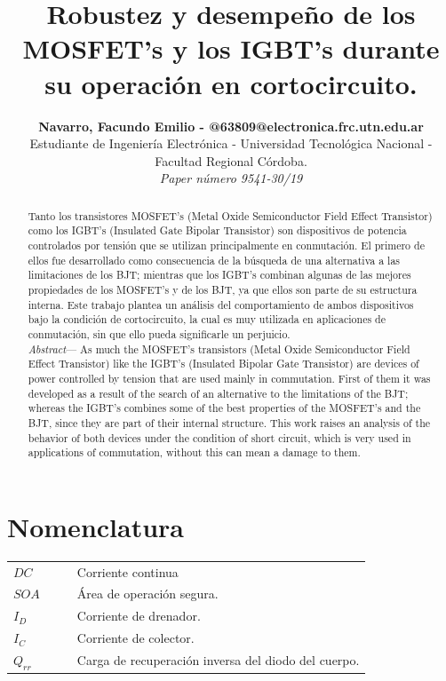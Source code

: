 \documentclass[conference]{IEEEtran}
\begin{document}
\title{Robustez y desempeño de los MOSFET's y los IGBT's durante su operación en cortocircuito.}
\author{
		\begin{tabular}{c}
			\textbf{Navarro, Facundo Emilio - @63809@electronica.frc.utn.edu.ar} \\ 
			Estudiante de Ingeniería Electrónica - Universidad Tecnológica Nacional - Facultad Regional Córdoba.\\
	\textit{Paper número 9541-30/19}
		\end{tabular}
		}
\maketitle

\begin{abstract}
Tanto los transistores MOSFET's (Metal Oxide Semiconductor Field Effect Transistor) como los IGBT's (Insulated Gate Bipolar Transistor) son dispositivos de potencia controlados por tensión que se utilizan principalmente en conmutación. El primero de ellos fue desarrollado como consecuencia de la búsqueda de una alternativa a las limitaciones de los BJT; mientras que los IGBT's combinan algunas de las mejores propiedades de los MOSFET's y de los BJT, ya que ellos son parte de su estructura interna. Este trabajo plantea un análisis del comportamiento de ambos dispositivos bajo la condición de cortocircuito, la cual es muy utilizada en aplicaciones de conmutación, sin que ello pueda significarle un perjuicio.\\

\textit{Abstract}--- As much the MOSFET's transistors (Metal Oxide Semiconductor Field Effect Transistor) like the IGBT's (Insulated Bipolar Gate Transistor) are devices of power controlled by tension that are used mainly in commutation.  First of them it was developed as a result of the search of an alternative to the limitations of the BJT;  whereas the IGBT's combines some of the best properties of the MOSFET's and the BJT, since they are part of their internal structure.  This work raises an analysis of the behavior of both devices under the condition of short circuit, which is very used in applications of commutation, without this can mean a damage to them.
\end{abstract} 

\IEEEpeerreviewmaketitle

\section*{Nomenclatura}
\begin{table}[H]
\centering
\begin{tabular}{lccl}
$DC$    & & & Corriente continua        \\
$SOA$  	& & & Área de operación segura. \\
$I_D$ 	& & & Corriente de drenador.   	\\
$I_C$ 	& & & Corriente de colector.  	\\
$Q_{rr}$& & & Carga de recuperación inversa del diodo del cuerpo.
\end{tabular}
\end{table}
\end{document}
